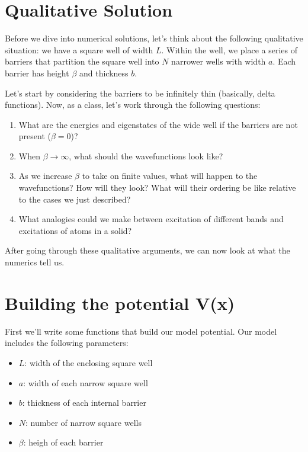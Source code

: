 \documentclass[letterpaper,10pt,english]{jupyterBook}
\begin{document}
\section{Qualitative Solution}
\label{\detokenize{Section6_v2:qualitative-solution}}
\sphinxAtStartPar
Before we dive into numerical solutions, let’s think about the following qualitative situation: we have a square well of width \(L\). Within the well, we place a series of barriers that partition the square well into \(N\) narrower wells with width \(a\). Each barrier has height \(\beta\) and thickness \(b\).

\sphinxAtStartPar
Let’s start by considering the barriers to be infinitely thin (basically, delta functions). Now, as a class, let’s work through the following questions:
\begin{enumerate}
%
\item {} 
\sphinxAtStartPar
What are the energies and eigenstates of the wide well if the barriers are not present (\(\beta=0\))?

\item {} 
\sphinxAtStartPar
When \(\beta \rightarrow \infty\), what should the wavefunctions look like?

\item {} 
\sphinxAtStartPar
As we increase \(\beta\) to take on finite values, what will happen to the wavefunctions? How will they look? What will their ordering be like relative to the cases we just described?

\item {} 
\sphinxAtStartPar
What analogies could we make between excitation of different bands and excitations of atoms in a solid?

\end{enumerate}

\sphinxAtStartPar
After going through these qualitative arguments, we can now look at what the numerics tell us.


\section{Building the potential V(x)}
\label{\detokenize{Section6_v2:building-the-potential-v-x}}
\sphinxAtStartPar
First we’ll write some functions that build our model potential. Our model includes the following parameters:
\begin{itemize}
\item {} 
\sphinxAtStartPar
\(L\): width of the enclosing square well

\item {} 
\sphinxAtStartPar
\(a\): width of each narrow square well

\item {} 
\sphinxAtStartPar
\(b\): thickness of each internal barrier

\item {} 
\sphinxAtStartPar
\(N\): number of narrow square wells

\item {} 
\sphinxAtStartPar
\(\beta\): heigh of each barrier

\end{itemize}
\end{document}
